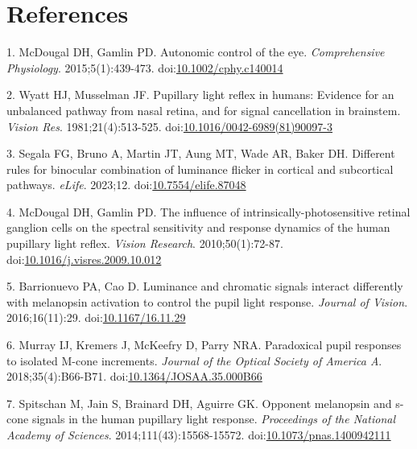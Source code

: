 \documentclass[
]{article}
\begin{document}
\hypertarget{references}{%
\section{References}\label{references}}

\hypertarget{refs}{}
\leavevmode\hypertarget{ref-McDougal2015}{}%
1. McDougal DH, Gamlin PD. Autonomic control of the eye. \emph{Comprehensive Physiology}. 2015;5(1):439-473. doi:\href{https://doi.org/10.1002/cphy.c140014}{10.1002/cphy.c140014}

\leavevmode\hypertarget{ref-Wyatt1981}{}%
2. Wyatt HJ, Musselman JF. Pupillary light reflex in humans: Evidence for an unbalanced pathway from nasal retina, and for signal cancellation in brainstem. \emph{Vision Res}. 1981;21(4):513-525. doi:\href{https://doi.org/10.1016/0042-6989(81)90097-3}{10.1016/0042-6989(81)90097-3}

\leavevmode\hypertarget{ref-Segala2023}{}%
3. Segala FG, Bruno A, Martin JT, Aung MT, Wade AR, Baker DH. Different rules for binocular combination of luminance flicker in cortical and subcortical pathways. \emph{eLife}. 2023;12. doi:\href{https://doi.org/10.7554/elife.87048}{10.7554/elife.87048}

\leavevmode\hypertarget{ref-McDougal2010}{}%
4. McDougal DH, Gamlin PD. The influence of intrinsically-photosensitive retinal ganglion cells on the spectral sensitivity and response dynamics of the human pupillary light reflex. \emph{Vision Research}. 2010;50(1):72-87. doi:\href{https://doi.org/10.1016/j.visres.2009.10.012}{10.1016/j.visres.2009.10.012}

\leavevmode\hypertarget{ref-Barrionuevo2016}{}%
5. Barrionuevo PA, Cao D. Luminance and chromatic signals interact differently with melanopsin activation to control the pupil light response. \emph{Journal of Vision}. 2016;16(11):29. doi:\href{https://doi.org/10.1167/16.11.29}{10.1167/16.11.29}

\leavevmode\hypertarget{ref-Murray2018}{}%
6. Murray IJ, Kremers J, McKeefry D, Parry NRA. Paradoxical pupil responses to isolated M-cone increments. \emph{Journal of the Optical Society of America A}. 2018;35(4):B66-B71. doi:\href{https://doi.org/10.1364/JOSAA.35.000B66}{10.1364/JOSAA.35.000B66}

\leavevmode\hypertarget{ref-Spitschan2014}{}%
7. Spitschan M, Jain S, Brainard DH, Aguirre GK. Opponent melanopsin and s-cone signals in the human pupillary light response. \emph{Proceedings of the National Academy of Sciences}. 2014;111(43):15568-15572. doi:\href{https://doi.org/10.1073/pnas.1400942111}{10.1073/pnas.1400942111}
\end{document}
